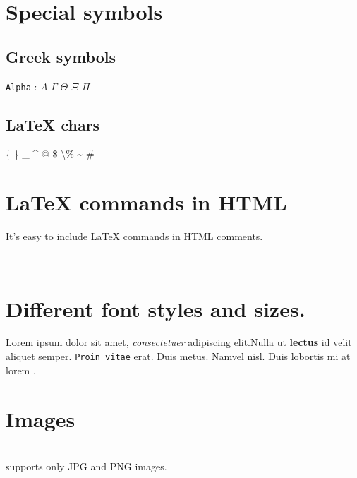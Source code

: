 \documentclass{article}
\newcommand{\Alpha}{A}
\begin{document}
\section*{Special symbols}
  
\subsection*{Greek symbols}
 
\par  \texttt{Alpha}
: $\Alpha$ $\Gamma$ $\Theta$ $\Xi$ $\Pi$ 
 
\subsection*{LaTeX chars}
 
\par \{ \} \_ \^{} @ \$ \textbackslash  \% \~{} \#
 
\section*{LaTeX commands in HTML}
 
\par It's easy to include LaTeX commands in HTML comments. \\ 
 
 
\section*{Different font styles and sizes.}
 
\par Lorem ipsum \fontsize{ 32pt}{12pt}\selectfont dolor\normalsize
sit amet, \textit{consectetuer}
adipiscing elit.Nulla ut \textbf{lectus}
id velit aliquet semper.  \texttt{Proin vitae}
erat. Duis metus. Namvel nisl. Duis \small lobortis\normalsize 
mi at \fontsize{ 8pt}{12pt}\selectfont lorem\normalsize
.

\href{#}{}  
 
\section*{Images}
 
\par  \\ 
 supports only JPG and PNG images.
\end{document}
